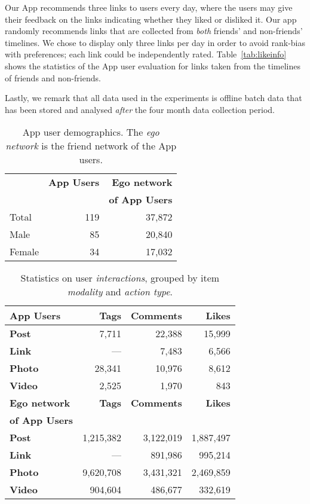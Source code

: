 Our App recommends three links to users every day, where the users may
give their feedback on the links indicating whether they liked or
disliked it. 
Our app randomly recommends links that are collected
from \emph{both} friends' and non-friends' timelines.  We chose to 
display only three links per day in order to avoid rank-bias with
preferences; each link could be independently rated.
Table~\ref{tab:likeinfo}
shows the statistics of the App user evaluation for links taken from the
timelines of friends and non-friends.  

Lastly, we remark that all data used in the experiments is offline
batch data that has been stored and analysed \emph{after} the four
month data collection period.
      							
\begin{table}[t!]
\centering
\begin{tabular}{|>{\small}l|>{\small}r|>{\small}r|}
\hline
& \textbf{App Users} & \textbf{Ego network} \\
& & \textbf{of App Users} \\
\hline
Total & 119 & 37,872 \\
\hline \hline
Male & 85 & 20,840 \\
\hline
Female & 34 & 17,032 \\
\hline
\end{tabular}
\caption{App user demographics.  The \emph{ego network} is the friend
network of the App users.}
\label{tab:demographics}
\end{table}

\begin{table}[t!]
\centering
\begin{tabular}{|>{\small}l|>{\small}r|>{\small}r|>{\small}r|}
\hline
\textbf{App Users} & \textbf{Tags} & \textbf{Comments} & \textbf{Likes} \\
\hline
\textbf{Post} & 7,711 & 22,388 & 15,999 \\
\hline
\textbf{Link}  & --- & 7,483 & 6,566 \\
\hline
\textbf{Photo} & 28,341 & 10,976 & 8,612 \\
\hline
\textbf{Video} & 2,525 & 1,970 & 843 \\
\hline
\hline
\textbf{Ego network} & \textbf{Tags} & \textbf{Comments} & \textbf{Likes} \\
\textbf{of App Users}  & & & \\
\hline
\textbf{Post} & 1,215,382 & 3,122,019 & 1,887,497 \\
\hline
\textbf{Link} & --- & 891,986 & 995,214 \\
\hline
\textbf{Photo} & 9,620,708 & 3,431,321 & 2,469,859 \\
\hline
\textbf{Video} & 904,604 & 486,677 & 332,619 \\
\hline
\end{tabular}
\caption{Statistics on user {\em interactions}, grouped by item {\em modality} and {\em action type}.}
\label{tab:interactions}
\end{table}

